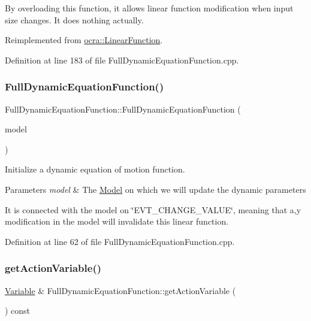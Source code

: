 By overloading this function, it allows linear function modification when input size changes. It does nothing actually. 

Reimplemented from \hyperlink{classocra_1_1LinearFunction_ac6bdf62ad6634397778d5f4223ed6d82}{ocra\+::\+Linear\+Function}.



Definition at line 183 of file Full\+Dynamic\+Equation\+Function.\+cpp.

\hypertarget{group__constraint_ga778bffa6d85a494b3ee0c499400573a6}{}\label{group__constraint_ga778bffa6d85a494b3ee0c499400573a6} 
\subsubsection{\texorpdfstring{Full\+Dynamic\+Equation\+Function()}{FullDynamicEquationFunction()}}
{\footnotesize\ttfamily Full\+Dynamic\+Equation\+Function\+::\+Full\+Dynamic\+Equation\+Function (\begin{DoxyParamCaption}\item[{const \hyperlink{classocra_1_1Model}{Model} \&}]{model }\end{DoxyParamCaption})}

Initialize a dynamic equation of motion function.


\begin{DoxyParams}{Parameters}
{\em model} & The \hyperlink{classocra_1_1Model}{Model} on which we will update the dynamic parameters\\
\hline
\end{DoxyParams}
It is connected with the model on \char`\"{}\+E\+V\+T\+\_\+\+C\+H\+A\+N\+G\+E\+\_\+\+V\+A\+L\+U\+E\char`\"{}, meaning that a,y modification in the model will invalidate this linear function. 

Definition at line 62 of file Full\+Dynamic\+Equation\+Function.\+cpp.

\hypertarget{group__constraint_gaa3c3057ca6a00bf88c372d0c467bed67}{}\label{group__constraint_gaa3c3057ca6a00bf88c372d0c467bed67} 
\subsubsection{\texorpdfstring{get\+Action\+Variable()}{getActionVariable()}}
{\footnotesize\ttfamily \hyperlink{classocra_1_1Variable}{Variable} \& Full\+Dynamic\+Equation\+Function\+::get\+Action\+Variable (\begin{DoxyParamCaption}{ }\end{DoxyParamCaption}) const}



